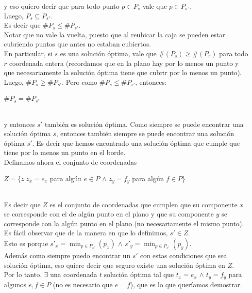 y eso quiero decir que para todo punto $p \in P_{s} $ vale que $ p \in P_{s'}$. \\
\indent Luego, $P_{s} \subseteq P_{s'}.$\\
\indent Es decir que $\#P_{s} \leq \#P_{s'}$. \\
\indent Notar que no vale la vuelta, puesto que al reubicar la caja se pueden estar cubriendo puntos que antes no estaban cubiertos.\\
									
\indent En particular, si $s$ es una soluci\'on \'optima, vale que $\#(P_{s}) \geq \#(P_{r}) $ para todo $r$ coordenada entera (recordamos que en la plano hay por lo menos un punto y que necesariamente la soluci\'on \'optima tiene que cubrir por lo menos un punto).\\
\indent Luego, $\#P_{s} \geq \#P_{s'}$. Pero como $\#P_{s} \leq \#P_{s'}$, entonces:\\

\begin{center}
$\#P_{s} = \#P_{s'}$
\end{center}\\

y entonces $s'$ tambi\'en es soluci\'on \'optima. Como siempre se puede encontrar una soluci\'on \'optima $s$, entonces tambi\'en siempre se puede encontrar una soluci\'on \'optima $s'$. Es decir que hemos encontrado una soluci\'on \'optima que cumple que tiene por lo menos un punto en el borde.\\

\indent Definamos ahora el conjunto de coordenadas\\
\begin{center}
$Z = \{z | z_{x}= e_{x} $ para alg\'un $e \in P$  $\wedge$ $z_{y}= f_{y}$ para alg\'un $f \in P\}$
\end{center}\\

\indent Es decir que $Z$ es el conjunto de coordenadas que cumplen que su componente $x$ se corresponde con el de alg\'un punto en el plano y que su componente $y$ se corresponde con la alg\'un punto en el plano (no necesariamente el mismo punto).\\

\indent Es fácil observar que de la manera en que lo definimos, $s' \in Z $.\\ 
\indent Esto es porque $s'_{x} =  \min_{p \in P_{s'}}(p_{x})$  $\wedge$  $s'_{y} =  \min_{p \in P_{s'}}(p_{y})$. \\
\indent  Adem\'as como siempre puedo encontrar un $s'$ con estas condiciones que sea soluci\'on \'optima, eso quiere decir que seguro existe una soluci\'on \'optima en $Z$.\\
\indent Por lo tanto, $\exists$ una coordenada $t$ soluci\'on \'optima tal que $t_{x} = e_{x}$ $\wedge$ $t_{y}=f_{y}$ para algunos $e,f \in P$ (no es necesario que $e=f$), que es lo que quer\'iamos demostrar.\\


